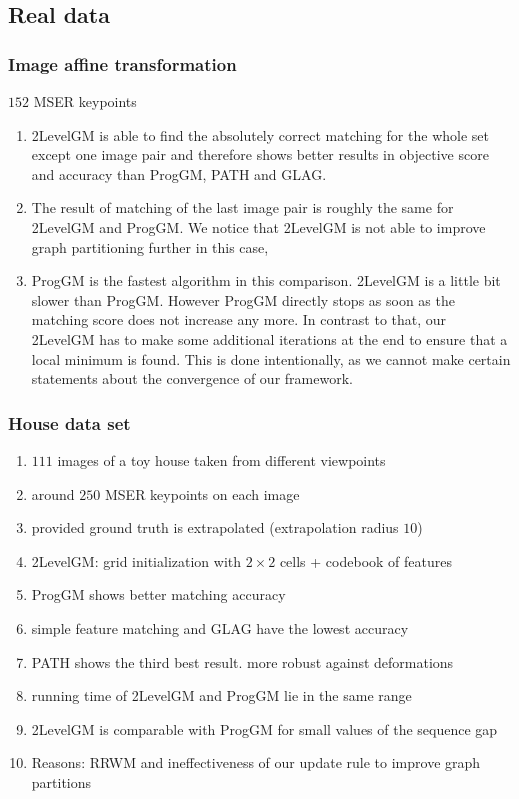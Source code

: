 \documentclass[handout]{beamer}
\begin{document}
\subsection{Real data}
\begin{frame}[allowframebreaks]
\frametitle{Image affine transformation}
\small
$152$ MSER keypoints

\begin{enumerate}
\item 2LevelGM is able to find the absolutely correct matching for the whole set except one image pair and therefore shows better results in objective score and accuracy than ProgGM, PATH and GLAG.

\item The result of matching of the last image pair is roughly the same for 2LevelGM and ProgGM. We notice that 2LevelGM is not able to improve graph partitioning further in this case,

\item ProgGM is the fastest algorithm in this comparison. 2LevelGM is a little bit slower than ProgGM. However ProgGM directly stops as soon as the matching score does not increase any more. In contrast to that, our 2LevelGM has to make some additional iterations at the end to ensure that a local minimum is found. This is done intentionally, as we cannot make certain statements about the convergence of our framework.
\end{enumerate}
\end{frame}
\begin{frame} %
\frametitle{House data set}
\small
\begin{enumerate}
\item $111$ images of a toy house taken from different viewpoints
\item around $250$ MSER keypoints on each image
\item provided ground truth is extrapolated (extrapolation radius $10$)
\item 2LevelGM: grid initialization with $2\times 2$ cells + codebook of features
\item ProgGM shows better matching accuracy
\item simple feature matching and GLAG have the lowest accuracy
\item PATH shows the third best result. more robust against deformations
\item running time of 2LevelGM and ProgGM lie in the same range
\item 2LevelGM is comparable with ProgGM for small values of the sequence gap
\item Reasons: RRWM and ineffectiveness of our update rule to improve graph partitions
\end{enumerate}

\end{frame}
\end{document}
